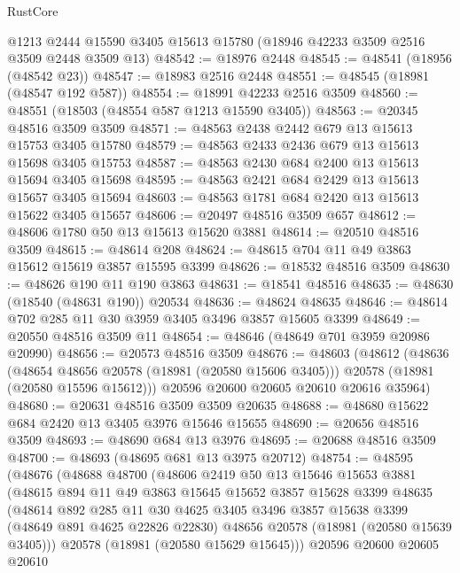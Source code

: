 \begin{lexlean}{RustCore}
\begin{coremodule}
    @1213
    @2444
    @15590
    @3405
    @15613
    @15780
    (@18946 @42233 @3509 @2516 @3509 @2448 @3509 @13)
@48542 := @18976 @2448
@48545 := @48541 (@18956 (@48542 @23))
@48547 := @18983 @2516 @2448
@48551 := @48545 (@18981 (@48547 @192 @587))
@48554 := @18991 @42233 @2516 @3509
@48560 := @48551 (@18503 (@48554 @587 @1213 @15590 @3405))
@48563 := @20345 @48516 @3509 @3509
@48571 := @48563 @2438 @2442 @679 @13 @15613 @15753 @3405 @15780
@48579 := @48563 @2433 @2436 @679 @13 @15613 @15698 @3405 @15753
@48587 := @48563 @2430 @684 @2400 @13 @15613 @15694 @3405 @15698
@48595 := @48563 @2421 @684 @2429 @13 @15613 @15657 @3405 @15694
@48603 := @48563 @1781 @684 @2420 @13 @15613 @15622 @3405 @15657
@48606 := @20497 @48516 @3509 @657
@48612 := @48606 @1780 @50 @13 @15613 @15620 @3881
@48614 := @20510 @48516 @3509
@48615 := @48614 @208
@48624 := @48615 @704 @11 @49 @3863 @15612 @15619 @3857 @15595 @3399
@48626 := @18532 @48516 @3509
@48630 := @48626 @190 @11 @190 @3863
@48631 := @18541 @48516
@48635 := @48630 (@18540 (@48631 @190)) @20534
@48636 := @48624 @48635
@48646 := @48614 @702 @285 @11 @30 @3959 @3405 @3496 @3857 @15605 @3399
@48649 := @20550 @48516 @3509 @11
@48654 := @48646 (@48649 @701 @3959 @20986 @20990)
@48656 := @20573 @48516 @3509
@48676 := @48603
    (@48612
      (@48636
        (@48654 @48656 @20578 (@18981 (@20580 @15606 @3405)))
        @20578
        (@18981 (@20580 @15596 @15612)))
      @20596
      @20600
      @20605
      @20610
      @20616
      @35964)
@48680 := @20631 @48516 @3509 @3509 @20635
@48688 := @48680 @15622 @684 @2420 @13 @3405 @3976 @15646 @15655
@48690 := @20656 @48516 @3509
@48693 := @48690 @684 @13 @3976
@48695 := @20688 @48516 @3509
@48700 := @48693 (@48695 @681 @13 @3975 @20712)
@48754 := @48595
    (@48676
      (@48688
        @48700
        (@48606
          @2419
          @50
          @13
          @15646
          @15653
          @3881
          (@48615
            @894
            @11
            @49
            @3863
            @15645
            @15652
            @3857
            @15628
            @3399
            @48635
            (@48614
              @892
              @285
              @11
              @30
              @4625
              @3405
              @3496
              @3857
              @15638
              @3399
              (@48649 @891 @4625 @22826 @22830)
              @48656
              @20578
              (@18981 (@20580 @15639 @3405)))
            @20578
            (@18981 (@20580 @15629 @15645)))
          @20596
          @20600
          @20605
          @20610

\end{coremodule}
\end{lexlean}
